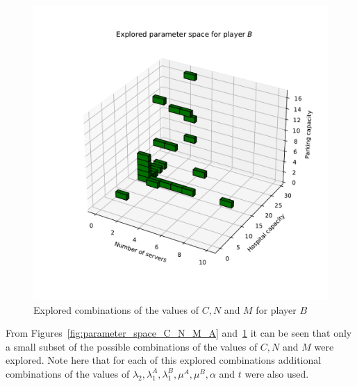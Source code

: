\begin{figure}[H]
    \centering
    \includegraphics[width=\linewidth]{chapters/05_numerical_results/Bin/descriptive/explored_parameters_2.pdf}
    \caption{Explored combinations of the values of \(C, N\) and \(M\) for
    player \(B\)}
    \label{fig:parameter_space_C_N_M_B}
\end{figure}

From Figures~\ref{fig:parameter_space_C_N_M_A}
and~\ref{fig:parameter_space_C_N_M_B} it can be seen that only a small subset
of the possible combinations of the values of \(C, N\) and \(M\) were explored.
Note here that for each of this explored combinations additional combinations
of the values of \(\lambda_2, \lambda_1^A, \lambda_1^B, \mu^A, \mu^B, \alpha\)
and \(t\) were also used.

